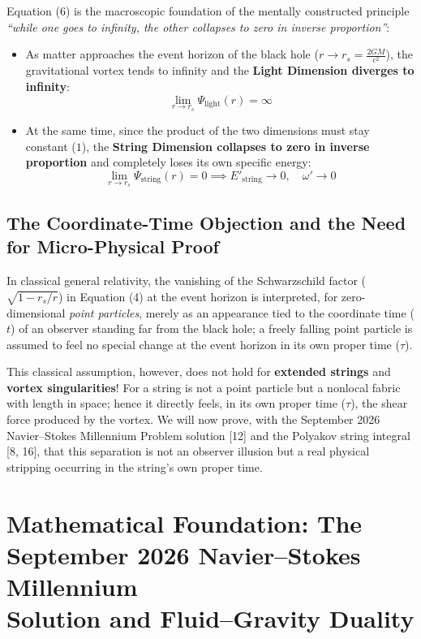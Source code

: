\documentclass[12pt,a4paper]{article}
\begin{document}
Equation (6) is the macroscopic foundation of the mentally constructed principle \textit{``while one goes to infinity, the other collapses to zero in inverse proportion''}:
\begin{itemize}
    \item As matter approaches the event horizon of the black hole ($r \to r_s = \frac{2GM}{c^2}$), the gravitational vortex tends to infinity and the \textbf{Light Dimension diverges to infinity}:
    \[
    \lim_{r \to r_s} \Psi_{\text{light}}(r) = \infty
    \]
    \item At the same time, since the product of the two dimensions must stay constant ($1$), the \textbf{String Dimension collapses to zero in inverse proportion} and completely loses its own specific energy:
    \[
    \lim_{r \to r_s} \Psi_{\text{string}}(r) = 0 \implies E'_{\text{string}} \to 0, \quad \omega' \to 0
    \]
\end{itemize}

\subsection{The Coordinate-Time Objection and the Need for Micro-Physical Proof}

In classical general relativity, the vanishing of the Schwarzschild factor ($\sqrt{1 - r_s/r}$) in Equation (4) at the event horizon is interpreted, for zero-dimensional \textit{point particles}, merely as an appearance tied to the coordinate time ($t$) of an observer standing far from the black hole; a freely falling point particle is assumed to feel no special change at the event horizon in its own proper time ($\tau$).

This classical assumption, however, does not hold for \textbf{extended strings} and \textbf{vortex singularities}! For a string is not a point particle but a nonlocal fabric with length in space; hence it directly feels, in its own proper time ($\tau$), the shear force produced by the vortex. We will now prove, with the September 2026 Navier--Stokes Millennium Problem solution [12] and the Polyakov string integral [8, 16], that this separation is not an observer illusion but a real physical stripping occurring in the string's own proper time.

\section{Mathematical Foundation: The September 2026 Navier--Stokes Millennium\\ Solution and Fluid--Gravity Duality}
\end{document}
